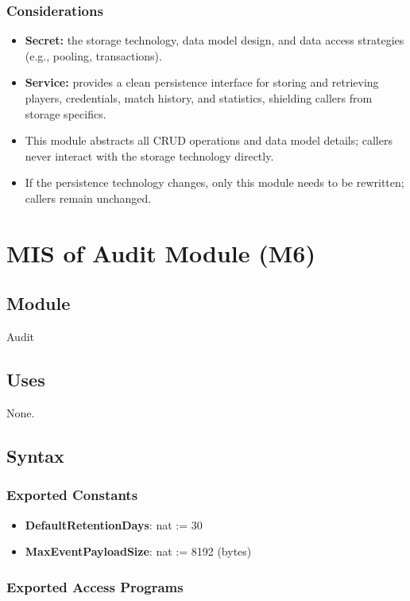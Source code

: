 \documentclass[12pt, titlepage]{article}
\begin{document}
\subsubsection{Considerations}
\begin{itemize}
    \item \textbf{Secret:} the storage technology, data model design, and data access strategies (e.g., pooling, transactions).
    \item \textbf{Service:} provides a clean persistence interface for storing and retrieving players, credentials, match history, and statistics, shielding callers from storage specifics.
    \item This module abstracts all CRUD operations and data model details; callers never interact with the storage technology directly.
    \item If the persistence technology changes, only this module needs to be rewritten; callers remain unchanged.
\end{itemize}

\newpage
\section{MIS of Audit Module (M6)}\label{sec:audit-module}

\subsection{Module}
Audit

\subsection{Uses}
None.

\subsection{Syntax}

\subsubsection{Exported Constants}
\begin{itemize}
    \item \textbf{DefaultRetentionDays}: nat := 30
    \item \textbf{MaxEventPayloadSize}: nat := 8192 \quad (bytes)
\end{itemize}

\subsubsection{Exported Access Programs}
\end{document}
